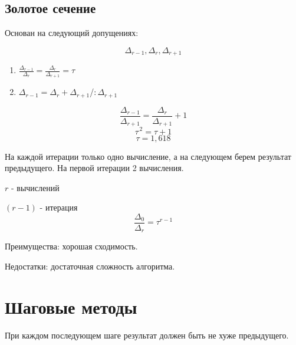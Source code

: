 \documentclass[12pt,a5paper]{scrbook}
\begin{document}
  \subsection{Золотое сечение}
  Основан на следующий допущениях:
  \par
  $$\Delta_{r-1}, \Delta_r, \Delta_{r+1}$$
  \par
  \begin{enumerate}
    \item $\frac{\Delta_{r-1}}{\Delta_r} = \frac{\Delta_r}{\Delta_{r+1}} = \tau$
    \item $\Delta_{r-1} = \Delta_r + \Delta_{r+1}$\qquad /$:\Delta_{r+1}$
  \end{enumerate}
  $$\frac{\Delta_{r-1}}{\Delta_{r+1}} = \frac{\Delta_r}{\Delta_{r+1}} + 1$$
  $$\tau^{\,2} = \tau + 1$$
  $$\tau = 1,618$$
  \par
  \par
  На каждой итерации только одно вычисление, а на следующем берем результат предыдущего. На первой итерации 2 вычисления.
  \par
  $r$ - вычислений
  \par
  $(r-1)$ - итерация
  $$\frac{\Delta_0}{\Delta_r} = \tau^{r-1}$$
  \par
  Преимущества: хорошая сходимость.
  \par
  Недостатки: достаточная сложность алгоритма.
  \section{Шаговые методы}
  При каждом последующем шаге результат должен быть не хуже предыдущего.
  \par
\end{document}
